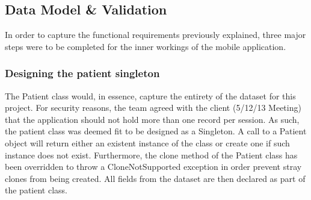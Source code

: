 \documentclass[12pt,a4paper,oneside,titlepage]{article}
\begin{document}
\subsection{Data Model \& Validation}
In order to capture the functional requirements previously explained, three major steps were to be completed for the inner workings of the mobile application.

\subsubsection{Designing the patient singleton}
The Patient class would, in essence, capture the entirety of the dataset for this project. For security reasons, the team agreed with the client (5/12/13 Meeting) that the application should not hold more than one record per session. As such, the patient class was deemed fit to be designed as a Singleton. A call to a Patient object will return either an existent instance of the class or create one if such instance does not exist. Furthermore, the clone method of the Patient class has been overridden to throw a CloneNotSupported exception in order prevent stray clones from being created. All fields from the dataset are then declared as part of the patient class.
\end{document}
